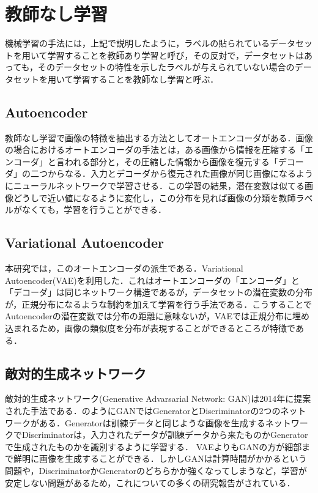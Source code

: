 \section{教師なし学習}
機械学習の手法には，上記で説明したように，ラベルの貼られているデータセットを用いて学習することを教師あり学習と呼び，その反対で，データセットはあっても，そのデータセットの特性を示したラベルが与えられていない場合のデータセットを用いて学習することを教師なし学習と呼ぶ．

\subsection{Autoencoder}
教師なし学習で画像の特徴を抽出する方法としてオートエンコーダがある．画像の場合におけるオートエンコーダの手法とは，ある画像から情報を圧縮する「エンコーダ」と言われる部分と，その圧縮した情報から画像を復元する「デコーダ」の二つからなる．入力とデコーダから復元された画像が同じ画像になるようにニューラルネットワークで学習させる．この学習の結果，潜在変数は似てる画像どうしで近い値になるように変化し，この分布を見れば画像の分類を教師ラベルがなくても，学習を行うことができる．

\subsection{Variational Autoencoder}
本研究では，このオートエンコーダの派生である．Variational Autoencoder(VAE)を利用した．これはオートエンコーダの「エンコーダ」と「デコーダ」は同じネットワーク構造であるが，データセットの潜在変数の分布が，正規分布になるような制約を加えて学習を行う手法である．こうすることでAutoencoderの潜在変数では分布の距離に意味ないが，VAEでは正規分布に埋め込まれるため，画像の類似度を分布が表現することができるところが特徴である．

\subsection{敵対的生成ネットワーク}
敵対的生成ネットワーク(Generative Advarsarial Network: GAN)は2014年に提案された手法である．のようにGANではGeneratorとDiscriminatorの2つのネットワークがある．Generatorは訓練データと同じような画像を生成するネットワークでDiscriminatorは，入力されたデータが訓練データから来たものかGeneratorで生成されたものかを識別するように学習する．
VAEよりもGANの方が細部まで鮮明に画像を生成することができる．しかしGANは計算時間がかかるという問題や，DiscriminatorかGeneratorのどちらかか強くなってしまうなど，学習が安定しない問題があるため，これについての多くの研究報告がされている．

